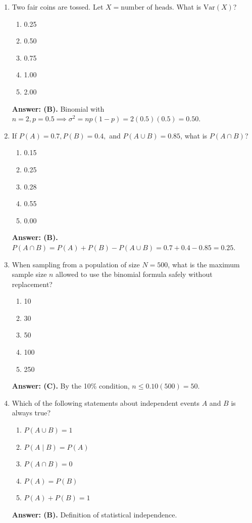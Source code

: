 \begin{enumerate}[resume, leftmargin=1.5em]
  \item Two fair coins are tossed. Let $X = \text{number of heads}$. What is $\text{Var}(X)$?
  \begin{enumerate}[label=(\Alph*)]
    \item 0.25 \item 0.50 \item 0.75 \item 1.00 \item 2.00
  \end{enumerate}
  \textbf{Answer: (B).} Binomial with $n=2, p=0.5 \implies \sigma^2 = np(1-p) = 2(0.5)(0.5) = 0.50$.

  \item If $P(A) = 0.7, P(B) = 0.4,$ and $P(A \cup B) = 0.85$, what is $P(A \cap B)$?
  \begin{enumerate}[label=(\Alph*)]
    \item 0.15 \item 0.25 \item 0.28 \item 0.55 \item 0.00
  \end{enumerate}
  \textbf{Answer: (B).} $P(A \cap B) = P(A) + P(B) - P(A \cup B) = 0.7 + 0.4 - 0.85 = 0.25$.

  \item When sampling from a population of size $N = 500$, what is the maximum sample size $n$ allowed to use the binomial formula safely without replacement?
  \begin{enumerate}[label=(\Alph*)]
    \item 10 \item 30 \item 50 \item 100 \item 250
  \end{enumerate}
  \textbf{Answer: (C).} By the 10\% condition, $n \le 0.10(500) = 50$.

  \item Which of the following statements about independent events $A$ and $B$ is always true?
  \begin{enumerate}[label=(\Alph*)]
    \item $P(A \cup B) = 1$ \item $P(A \mid B) = P(A)$ \item $P(A \cap B) = 0$ \item $P(A) = P(B)$ \item $P(A) + P(B) = 1$
  \end{enumerate}
  \textbf{Answer: (B).} Definition of statistical independence.


\end{enumerate}
